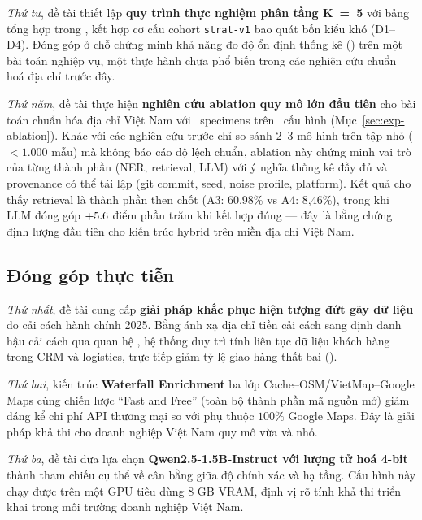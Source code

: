 \emph{Thứ tư}, đề tài thiết lập \textbf{quy trình thực nghiệm phân tầng K~=~5} với bảng tổng hợp  trong , kết hợp cơ cấu cohort \texttt{strat-v1} bao quát bốn kiểu khó (D1--D4). Đóng góp ở chỗ chứng minh khả năng đo độ ổn định thống kê () trên một bài toán nghiệp vụ, một thực hành chưa phổ biến trong các nghiên cứu chuẩn hoá địa chỉ trước đây.

\emph{Thứ năm}, đề tài thực hiện \textbf{nghiên cứu ablation quy mô lớn đầu tiên} cho bài toán chuẩn hóa địa chỉ Việt Nam với \VNAIABLATIONTotalSpecimens\, specimens trên \VNAIABLATIONNumConfigs\, cấu hình (Mục~\ref{sec:exp-ablation}). Khác với các nghiên cứu trước chỉ so sánh 2--3 mô hình trên tập nhỏ (\(< 1.000\) mẫu) mà không báo cáo độ lệch chuẩn, ablation này chứng minh vai trò của từng thành phần (NER, retrieval, LLM) với ý nghĩa thống kê đầy đủ và provenance có thể tái lập (git commit, seed, noise profile, platform). Kết quả cho thấy retrieval là thành phần then chốt (A3: 60{,}98\% vs A4: 8{,}46\%), trong khi LLM đóng góp \(+5.6\) điểm phần trăm khi kết hợp đúng --- đây là bằng chứng định lượng đầu tiên cho kiến trúc hybrid trên miền địa chỉ Việt Nam.

\subsection{Đóng góp thực tiễn}
\label{sec:concl-practical}

\emph{Thứ nhất}, đề tài cung cấp \textbf{giải pháp khắc phục hiện tượng đứt gãy dữ liệu} do cải cách hành chính 2025. Bằng ánh xạ địa chỉ tiền cải cách sang định danh hậu cải cách qua quan hệ , hệ thống duy trì tính liên tục dữ liệu khách hàng trong CRM và logistics, trực tiếp giảm tỷ lệ giao hàng thất bại ().

\emph{Thứ hai}, kiến trúc \textbf{Waterfall Enrichment} ba lớp Cache--OSM/VietMap--Google Maps cùng chiến lược ``Fast and Free'' (toàn bộ thành phần  mã nguồn mở) giảm đáng kể chi phí API thương mại so với phụ thuộc \(100\%\) Google Maps. Đây là giải pháp khả thi cho doanh nghiệp Việt Nam quy mô vừa và nhỏ.

\emph{Thứ ba}, đề tài đưa lựa chọn \textbf{Qwen2.5-1.5B-Instruct với lượng tử hoá 4-bit} thành tham chiếu cụ thể về cân bằng giữa độ chính xác và hạ tầng. Cấu hình này chạy được trên một GPU tiêu dùng \(8\) GB VRAM, định vị rõ tính khả thi triển khai trong môi trường doanh nghiệp Việt Nam.

